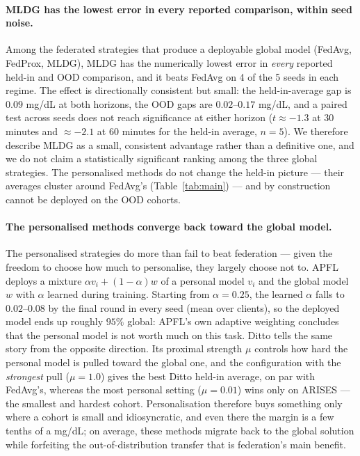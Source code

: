 \documentclass[10pt,letterpaper]{article}
\begin{document}
\paragraph{MLDG has the lowest error in every reported comparison, within seed
noise.} Among the federated strategies that produce a deployable global
model (FedAvg, FedProx, MLDG), MLDG
has the numerically lowest error in \emph{every} reported held-in and OOD
comparison, and
it beats FedAvg on 4 of the 5 seeds in each regime. The effect is directionally
consistent but small: the held-in-average gap is $0.09$ mg/dL at both horizons,
the OOD gaps are $0.02$--$0.17$ mg/dL, and a paired test across seeds does not
reach significance at either horizon ($t \approx -1.3$ at 30 minutes and
$\approx -2.1$ at 60 minutes for the held-in average, $n=5$). We therefore
describe MLDG as a small, consistent advantage rather than a definitive one, and
we do not claim a statistically significant ranking among the three global
strategies. The personalised methods do not change the
held-in picture --- their averages cluster around FedAvg's
(Table~\ref{tab:main}) --- and by construction cannot be deployed on the OOD
cohorts.

\paragraph{The personalised methods converge back toward the global model.} The
personalised strategies do more than fail to beat federation --- given the freedom
to choose how much to personalise, they largely choose not to. APFL deploys a
mixture $\alpha v_i + (1-\alpha) w$ of a personal model $v_i$ and the global model
$w$ with $\alpha$ learned during training. Starting from $\alpha = 0.25$, the
learned $\alpha$ falls to $0.02$--$0.08$ by the final round in every seed
(mean over clients), so the deployed model ends up roughly $95\%$ global: APFL's
own adaptive weighting concludes that the personal model is not worth much on this
task. Ditto tells the same story from the opposite direction. Its proximal
strength $\mu$ controls how hard the personal model is pulled toward the global
one, and the configuration with the \emph{strongest} pull ($\mu = 1.0$) gives
the best Ditto held-in average, on par with FedAvg's, whereas the most personal
setting ($\mu = 0.01$) wins only on ARISES --- the smallest and hardest
cohort. Personalisation therefore buys something only where a cohort is small and
idiosyncratic, and even there the margin is a few tenths of a mg/dL; on average,
these methods migrate back to the global solution while forfeiting the
out-of-distribution transfer that is federation's main benefit.
\end{document}

